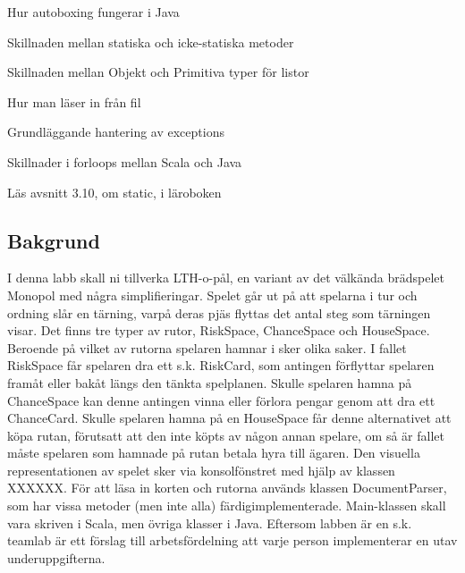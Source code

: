

\Lab{\LabWeekELEVEN}

\begin{Goals}
\item Hur autoboxing fungerar i Java
\item Skillnaden mellan statiska och icke-statiska metoder
\item Skillnaden mellan Objekt och Primitiva typer för listor
\item Hur man läser in från fil
\item Grundläggande hantering av exceptions
\item Skillnader i forloops mellan Scala och Java

\end{Goals}

\begin{Preparations}
\item Läs avsnitt 3.10, om static, i läroboken
\end{Preparations}

\subsection{Bakgrund}
I denna labb skall ni tillverka LTH-o-pål, en variant av det välkända brädspelet Monopol med några simplifieringar. Spelet går ut på att spelarna i tur och ordning slår en tärning, varpå deras pjäs flyttas det antal steg som tärningen visar. Det finns tre typer av rutor, RiskSpace, ChanceSpace och HouseSpace. Beroende på vilket av rutorna spelaren hamnar i sker olika saker. I fallet RiskSpace får spelaren dra ett s.k. RiskCard, som antingen förflyttar spelaren framåt eller bakåt längs den tänkta spelplanen. Skulle spelaren hamna på ChanceSpace kan denne antingen vinna eller förlora pengar genom att dra ett ChanceCard. Skulle spelaren hamna på en HouseSpace får denne alternativet att köpa rutan, förutsatt att den inte köpts av någon annan spelare, om så är fallet måste spelaren som hamnade på rutan betala hyra till ägaren.
Den visuella representationen av spelet sker via konsolfönstret med hjälp av klassen XXXXXX. 
För att läsa in korten och rutorna används klassen DocumentParser, som har vissa metoder (men inte alla) färdigimplementerade.
Main-klassen skall vara skriven i Scala, men övriga klasser i Java. 
Eftersom labben är en s.k. teamlab är ett förslag till arbetsfördelning att varje person implementerar en utav underuppgifterna.

